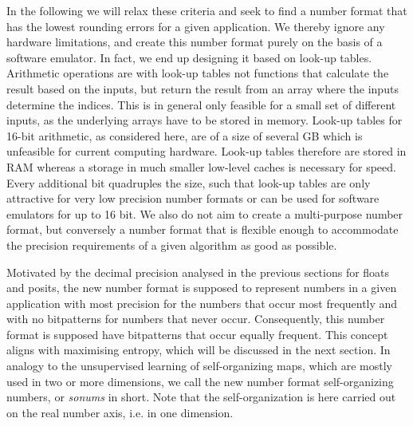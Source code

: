 In the following we will relax these criteria and seek to find a number format that has the lowest rounding errors for a given application. We thereby ignore any hardware limitations, and create this number format purely on the basis of a software emulator. In fact, we end up designing it based on look-up tables. Arithmetic operations are with look-up tables not functions that calculate the result based on the inputs, but return the result from an array where the inputs determine the indices. This is in general only feasible for a small set of different inputs, as the underlying arrays have to be stored in memory. Look-up tables for 16-bit arithmetic, as considered here, are of a size of several GB which is unfeasible for current computing hardware. Look-up tables therefore are stored in RAM whereas a storage in much smaller low-level caches is necessary for speed. Every additional bit quadruples the size, such that look-up tables are only attractive for very low precision number formats or can be used for software emulators for up to 16 bit. We also do not aim to create a multi-purpose number format, but conversely a number format that is flexible enough to accommodate the precision requirements of a given algorithm as good as possible.

Motivated by the decimal precision analysed in the previous sections for floats and posits, the new number format is supposed to represent numbers in a given application with most precision for the numbers that occur most frequently and with no bitpatterns for numbers that never occur. Consequently, this number format is supposed have bitpatterns that occur equally frequent. This concept aligns with maximising entropy, which will be discussed in the next section. In analogy to the unsupervised learning of self-organizing maps, which are mostly used in two or more dimensions, we call the new number format self-organizing numbers, or \emph{sonums} in short. Note that the self-organization is here carried out on the real number axis, i.e. in one dimension.

